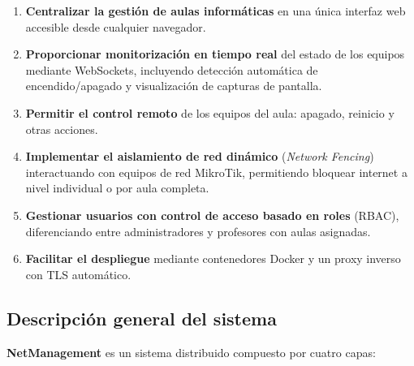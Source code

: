 \documentclass[12pt, a4paper, twoside]{article}
\begin{document}
\begin{enumerate}
  \item \textbf{Centralizar la gestión de aulas informáticas} en una única interfaz web accesible desde cualquier navegador.
  \item \textbf{Proporcionar monitorización en tiempo real} del estado de los equipos mediante WebSockets, incluyendo detección automática de encendido/apagado y visualización de capturas de pantalla.
  \item \textbf{Permitir el control remoto} de los equipos del aula: apagado, reinicio y otras acciones.
  \item \textbf{Implementar el aislamiento de red dinámico} (\textit{Network Fencing}) interactuando con equipos de red MikroTik, permitiendo bloquear internet a nivel individual o por aula completa.
  \item \textbf{Gestionar usuarios con control de acceso basado en roles} (RBAC), diferenciando entre administradores y profesores con aulas asignadas.
  \item \textbf{Facilitar el despliegue} mediante contenedores Docker y un proxy inverso con TLS automático.
\end{enumerate}

\subsection{Descripción general del sistema}

\textbf{NetManagement} es un sistema distribuido compuesto por cuatro capas:
\end{document}
